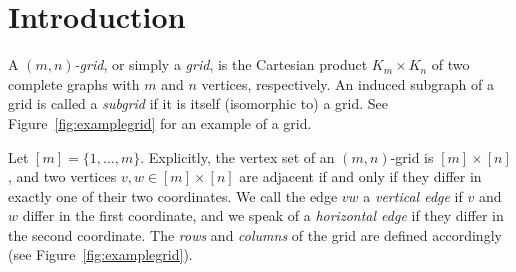 \documentclass[runningheads,a4paper]{llncs}
\begin{document}
\section{Introduction}
A \emph{$(m,n)$-grid}, or simply a \emph{grid}, is the Cartesian product $K_m \times K_n$ of two complete graphs with $m$ and $n$ vertices, respectively. An induced subgraph of a grid is called a \emph{subgrid} if it is itself (isomorphic to) a grid.
See Figure~\ref{fig:examplegrid} for an example of a grid.

Let $[m] = \{1,\ldots,m\}$.
Explicitly, the vertex set of an $(m,n)$-grid is $[m] \times [n]$, and two
vertices $v,w \in [m] \times [n]$ are adjacent if and only if they differ in
exactly one of their two coordinates.
We call the edge $vw$ a \emph{vertical edge} if $v$ and $w$ differ in the
first coordinate, and we speak of a \emph{horizontal edge} if they differ in the
second coordinate. The \emph{rows} and \emph{columns} of the grid are defined accordingly (see Figure~\ref{fig:examplegrid}).
\end{document}
